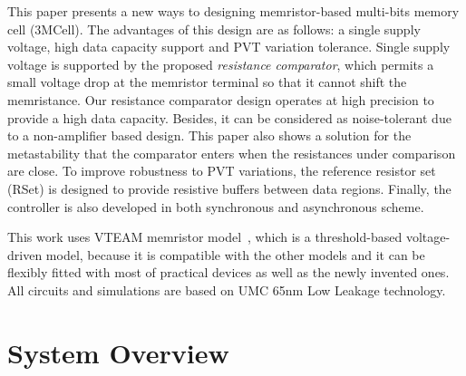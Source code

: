 \documentclass[twocolumn,conference]{IEEEtran}
\begin{document}
This paper presents a new ways to designing memristor-based multi-bits memory cell (3MCell). The advantages of this design are as follows: a single supply voltage, high data capacity support and PVT variation tolerance. Single supply voltage is supported by the proposed \textit{resistance comparator}, which permits a small voltage drop at the memristor terminal so that it cannot shift the memristance. Our resistance comparator design operates at high precision to provide a high data capacity. Besides, it can be considered as noise-tolerant due to a non-amplifier based design. This paper also shows a solution for the metastability that the comparator enters when the resistances under comparison are close. To improve robustness to PVT variations, the reference resistor set (RSet) is designed to provide resistive buffers between data regions. Finally, the controller is also developed in both synchronous and asynchronous scheme.

This work uses VTEAM memristor model~\cite{Kvatinsky-2015-TCSII}, which is a threshold-based voltage-driven model, because it is compatible with the other models and it can be flexibly fitted with most of practical devices as well as the newly invented ones. All circuits and simulations are based on UMC 65nm Low Leakage technology.
\section{System Overview}
\label{sec:SystemOverview}
\end{document}
